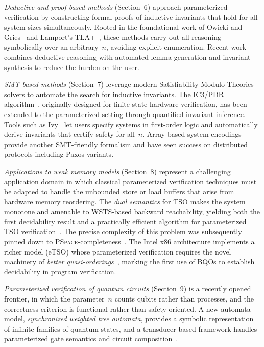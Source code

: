 \emph{Deductive and proof-based methods} (Section~6) approach parameterized
verification by constructing formal proofs of inductive invariants that hold
for all system sizes simultaneously. Rooted in the foundational work of Owicki
and Gries~\cite{OG76} and Lamport's TLA+~\cite{Lam94}, these methods carry
out all reasoning symbolically over an arbitrary~$n$, avoiding explicit
enumeration. Recent work combines deductive reasoning with automated lemma
generation and invariant synthesis to reduce the burden on the user.

\emph{SMT-based methods} (Section~7) leverage modern Satisfiability Modulo
Theories solvers to automate the search for inductive invariants. The IC3/PDR
algorithm~\cite{Bra11}, originally designed for finite-state hardware
verification, has been extended to the parameterized setting through quantified
invariant inference. Tools such as Ivy~\cite{PLSS16} let users specify systems
in first-order logic and automatically derive invariants that certify safety
for all~$n$. Array-based system encodings~\cite{GS10} provide another
SMT-friendly formalism and have seen success on distributed protocols including
Paxos variants.

\emph{Applications to weak memory models} (Section~8) represent a challenging
application domain in which classical parameterized verification techniques
must be adapted to handle the unbounded store or load buffers that arise from
hardware memory reordering. The \emph{dual semantics} for TSO makes the system
monotone and amenable to WSTS-based backward reachability, yielding both the
first decidability result and a practically efficient algorithm for parameterized
TSO verification~\cite{AABN16,AABN_journal}. The precise complexity of this
problem was subsequently pinned down to \textsc{PSpace}-completeness~\cite{AAR20}.
The Intel x86 architecture implements a richer model (eTSO) whose parameterized
verification requires the novel machinery of \emph{better
quasi-orderings}~\cite{AABKS25}, marking the first use of BQOs to establish
decidability in program verification.

\emph{Parameterized verification of quantum circuits} (Section~9) is a
recently opened frontier, in which the parameter~$n$ counts qubits rather
than processes, and the correctness criterion is functional rather than
safety-oriented. A new automata model, \emph{synchronized weighted tree
automata}, provides a symbolic representation of infinite families of quantum
states, and a transducer-based framework handles parameterized gate
semantics and circuit composition~\cite{AutoQPara}.

